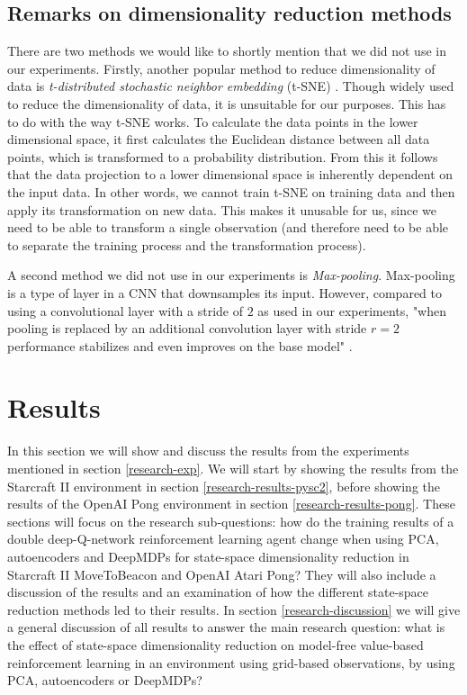 \subsection{Remarks on dimensionality reduction methods}
There are two methods we would like to shortly mention that we did not use in our experiments. Firstly, another popular method to reduce dimensionality of data is \emph{t-distributed stochastic neighbor embedding} (t-SNE) \cite{tsne}. Though widely used to reduce the dimensionality of data, it is unsuitable for our purposes. This has to do with the way t-SNE works. To calculate the data points in the lower dimensional space, it first calculates the Euclidean distance between all data points, which is transformed to a probability distribution. From this it follows that the data projection to a lower dimensional space is inherently dependent on the input data. In other words, we cannot train t-SNE on training data and then apply its transformation on new data. This makes it unusable for us, since we need to be able to transform a single observation (and therefore need to be able to separate the training process and the transformation process). 

A second method we did not use in our experiments is \emph{Max-pooling}. Max-pooling is a type of layer in a CNN that downsamples its input. However, compared to using a convolutional layer with a stride of $2$ as used in our experiments, "when pooling is replaced by an additional convolution layer with stride $r = 2$ performance stabilizes and even improves on the base model" \cite{maxvsconv}.
 

\section{Results}\label{research-results}
In this section we will show and discuss the results from the experiments mentioned in section \ref{research-exp}. We will start by showing the results from the Starcraft II environment in section \ref{research-results-pysc2}, before showing the results of the OpenAI Pong environment in section \ref{research-results-pong}. These sections will focus on the research sub-questions: how do the training results of a double deep-Q-network reinforcement learning agent change when using PCA, autoencoders and DeepMDPs for state-space dimensionality reduction in Starcraft II MoveToBeacon and OpenAI Atari Pong? They will also include a discussion of the results and an examination of how the different state-space reduction methods led to their results. In section \ref{research-discussion} we will give a general discussion of all results to answer the main research question: what is the effect of state-space dimensionality reduction on model-free value-based reinforcement learning in an environment using grid-based observations, by using PCA, autoencoders or DeepMDPs?

